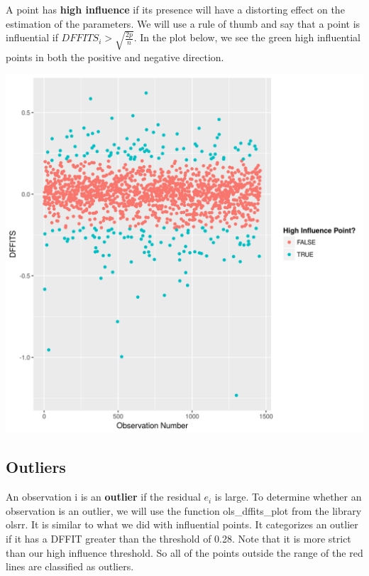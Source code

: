 \documentclass[12pt]{article}
\begin{document}
\begin{flushleft}
\begin{flushleft}
\begin{flushleft}
A point has \textbf{high influence} if its presence will have a distorting effect on the estimation of the parameters. We will use a rule of thumb and say that a point is influential if $DFFITS_{i} > \sqrt{\frac{2p}{n}}$. In the plot below, we see the green high influential points in both the positive and negative direction.

\end{flushleft}

\centering
    \vspace*{0.5 cm}
    \includegraphics[scale = .40]{influence.png}\\[1.0 cm]	

\begin{flushleft}

\subsection{Outliers}
An observation i is an \textbf{outlier} if the residual $e_{i}$ is large. To determine whether an observation is an outlier, we will use the function ols\_dffits\_plot from the library olsrr. It is similar to what we did with influential points. It categorizes an outlier if it has a DFFIT greater than the threshold of 0.28. Note that it is more strict than  our high influence threshold. So all of the points outside the range of the red lines are classified as outliers.


\end{flushleft}
\end{flushleft}
\end{flushleft}
\end{document}
